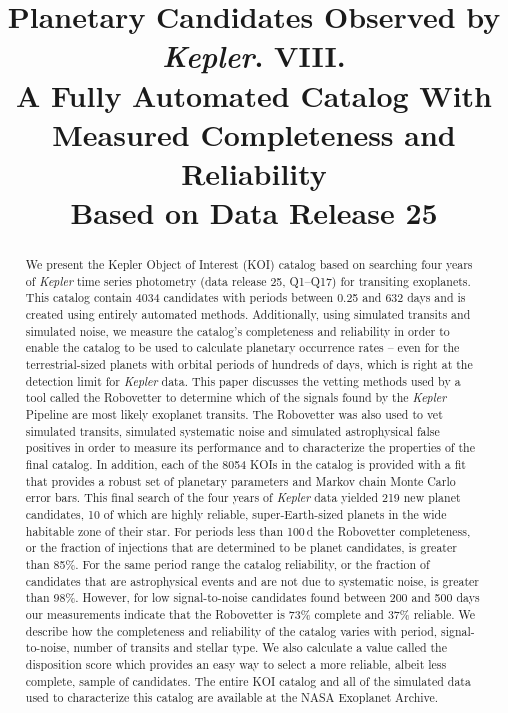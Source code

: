 \documentclass[apj,twocolappendix,numberedappendix]{emulateapj}
\renewcommand{\_}{\discretionary{\underscore}{}{\underscore}}  %
\newcommand\Kepler{\textit{Kepler}}
\begin{document}

\title{Planetary Candidates Observed by \Kepler. VIII.\\
A Fully Automated Catalog With Measured Completeness and Reliability\\Based on Data Release 25 }



\begin{abstract}
We present the Kepler Object of Interest (KOI) catalog based on searching four years of \Kepler{} time series photometry (data release 25, Q1--Q17) for transiting exoplanets. This catalog contain 4034 candidates with periods between 0.25 and 632 days and is created using entirely automated methods. Additionally, using simulated transits and simulated noise, we measure the catalog's completeness and reliability in order to enable the catalog to be used to calculate planetary occurrence rates -- even for the terrestrial-sized planets with orbital periods of hundreds of days, which is right at the detection limit for \Kepler{} data.  This paper discusses the vetting methods used by a tool called the Robovetter to determine which of the \ntces{} signals found by the \Kepler{} Pipeline \citep{Twicken2016} are most likely exoplanet transits.  The Robovetter was also used to vet simulated transits, simulated systematic noise and simulated astrophysical false positives in order to measure its performance and to characterize the properties of the final catalog. In addition, each of the 8054 KOIs in the catalog is provided with a fit that provides a robust set of planetary parameters and Markov chain Monte Carlo error bars. This final search of the four years of \Kepler{} data yielded 219 new planet candidates, 10 of which are highly reliable, super-Earth-sized planets in the wide habitable zone of their star. For periods less than 100\,d the Robovetter completeness, or the fraction of injections that are determined to be planet candidates, is greater than 85\%. For the same period range the catalog reliability, or the fraction of candidates that are astrophysical events and are not due to systematic noise, is greater than 98\%.  However, for low signal-to-noise candidates found between 200 and 500 days our measurements indicate that the Robovetter is 73\% complete and 37\% reliable. We describe how the completeness and reliability of the catalog varies with period, signal-to-noise, number of transits and stellar type. We also calculate a value called the disposition score which provides an easy way to select a more reliable, albeit less complete, sample of candidates. The entire KOI catalog and all of the simulated data used to characterize this catalog are available at the NASA Exoplanet Archive.


\end{abstract}
\end{document}
